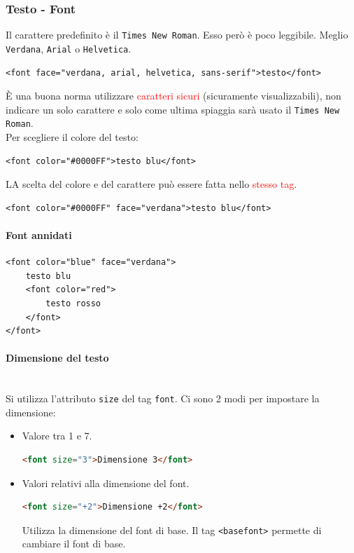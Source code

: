 \documentclass{article}
\begin{document}
\subsubsection{Testo - Font}
Il carattere predefinito è il \texttt{Times New Roman}. Esso però è poco leggibile. Meglio \texttt{Verdana}, \texttt{Arial} o \texttt{Helvetica}.
\begin{lstlisting}[style=htmlstyle]
<font face="verdana, arial, helvetica, sans-serif">testo</font>
\end{lstlisting}
È una buona norma utilizzare \textcolor{red}{caratteri sicuri} (sicuramente visualizzabili), non indicare un solo carattere e solo come ultima spiaggia sarà usato il \texttt{Times New Roman}.
\\ Per scegliere il colore del testo:
\begin{lstlisting}[style=htmlstyle]
<font color="#0000FF">testo blu</font>
\end{lstlisting}
LA scelta del colore e del carattere può essere fatta nello \textcolor{red}{stesso tag}.
\begin{lstlisting}[style=htmlstyle]
<font color="#0000FF" face="verdana">testo blu</font>
\end{lstlisting}
\paragraph{Font annidati} \mbox{}
\begin{lstlisting}[style=htmlstyle]
<font color="blue" face="verdana">
    testo blu
    <font color="red">
        testo rosso
    </font>
</font>
\end{lstlisting}
\paragraph{Dimensione del testo} \mbox{} \\
Si utilizza l'attributo \texttt{size} del tag \texttt{font}. Ci sono 2 modi per impostare la dimensione:
\begin{itemize}
    \item Valore tra 1 e 7.
    \begin{lstlisting}[language=html]
    <font size="3">Dimensione 3</font>
    \end{lstlisting}
    \item Valori relativi alla dimensione del font.
    \begin{lstlisting}[language=html]
    <font size="+2">Dimensione +2</font>
    \end{lstlisting}
    Utilizza la dimensione del font di base. Il tag \texttt{<basefont>} permette di cambiare il font di base.
\end{itemize}
\end{document}

